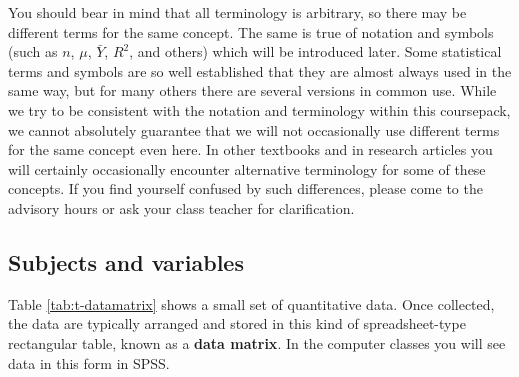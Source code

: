 \documentclass[11pt,a4paper,openany]{book}
\begin{document}
You should bear in mind that all terminology is arbitrary, so there may
be different terms for the same concept. The same is true of notation
and symbols (such as \(n\), \(\mu\), \(\bar{Y}\), \(R^{2}\), and others)
which will be introduced later. Some statistical terms and symbols are
so well established that they are almost always used in the same way,
but for many others there are several versions in common use. While we
try to be consistent with the notation and terminology within this
coursepack, we cannot absolutely guarantee that we will not occasionally
use different terms for the same concept even here. In other textbooks
and in research articles you will certainly occasionally encounter
alternative terminology for some of these concepts. If you find yourself
confused by such differences, please come to the advisory hours or ask
your class teacher for clarification.

\subsection{Subjects and variables}\label{ss-intro-def-subj}

Table \ref{tab:t-datamatrix} shows a small set of quantitative data.
Once collected, the data are typically arranged and stored in this kind
of spreadsheet-type rectangular table, known as a \textbf{data matrix}.
In the computer classes you will see data in this form in SPSS.
\end{document}
